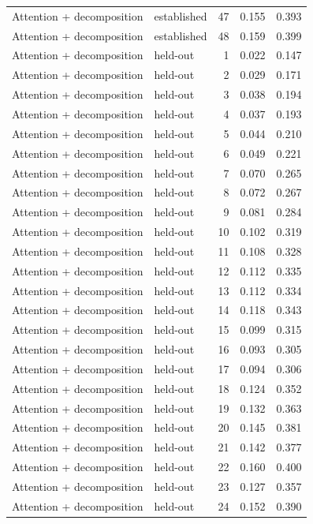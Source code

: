 \begin{tabular}{llrrr}
Attention + decomposition & established & 47 & 0.155 & 0.393 \\
Attention + decomposition & established & 48 & 0.159 & 0.399 \\
Attention + decomposition & held-out & 1 & 0.022 & 0.147 \\
Attention + decomposition & held-out & 2 & 0.029 & 0.171 \\
Attention + decomposition & held-out & 3 & 0.038 & 0.194 \\
Attention + decomposition & held-out & 4 & 0.037 & 0.193 \\
Attention + decomposition & held-out & 5 & 0.044 & 0.210 \\
Attention + decomposition & held-out & 6 & 0.049 & 0.221 \\
Attention + decomposition & held-out & 7 & 0.070 & 0.265 \\
Attention + decomposition & held-out & 8 & 0.072 & 0.267 \\
Attention + decomposition & held-out & 9 & 0.081 & 0.284 \\
Attention + decomposition & held-out & 10 & 0.102 & 0.319 \\
Attention + decomposition & held-out & 11 & 0.108 & 0.328 \\
Attention + decomposition & held-out & 12 & 0.112 & 0.335 \\
Attention + decomposition & held-out & 13 & 0.112 & 0.334 \\
Attention + decomposition & held-out & 14 & 0.118 & 0.343 \\
Attention + decomposition & held-out & 15 & 0.099 & 0.315 \\
Attention + decomposition & held-out & 16 & 0.093 & 0.305 \\
Attention + decomposition & held-out & 17 & 0.094 & 0.306 \\
Attention + decomposition & held-out & 18 & 0.124 & 0.352 \\
Attention + decomposition & held-out & 19 & 0.132 & 0.363 \\
Attention + decomposition & held-out & 20 & 0.145 & 0.381 \\
Attention + decomposition & held-out & 21 & 0.142 & 0.377 \\
Attention + decomposition & held-out & 22 & 0.160 & 0.400 \\
Attention + decomposition & held-out & 23 & 0.127 & 0.357 \\
Attention + decomposition & held-out & 24 & 0.152 & 0.390 \\

\end{tabular}
